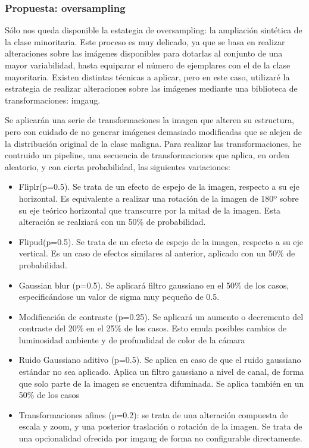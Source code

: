 \subsubsection{Propuesta: oversampling}

Sólo nos queda disponible la estategia de oversampling: la ampliación sintética de la clase minoritaria. Este proceso es muy delicado, ya que se basa en realizar alteraciones sobre las imágenes disponibles para dotarlas al conjunto de una mayor variabilidad, hasta equiparar el número de ejemplares con el de la clase mayoritaria. Existen distintas técnicas a aplicar, pero en este caso, utilizaré la estrategia de realizar alteraciones sobre las imágenes mediante una biblioteca de transformaciones: imgaug.

Se aplicarán una serie de transformaciones la imagen que alteren su estructura, pero con cuidado de no generar imágenes demasiado modificadas que se alejen de la distribución original de la clase maligna. Para realizar las transformaciones, he contruido un pipeline, una secuencia de transformaciones que aplica, en orden aleatorio, y con cierta probabilidad, las siguientes variaciones:

\begin{itemize}
	\item Fliplr(p=0.5). Se trata de un efecto de espejo de la imagen, respecto a su eje horizontal. Es equivalente a realizar una rotación de la imagen de 180º sobre su eje teórico horizontal que transcurre por la mitad de la imagen. Esta alteración se realziará con un 50\% de probabilidad.
	\item Flipud(p=0.5). Se trata de un efecto de espejo de la imagen, respecto a su eje vertical. Es un caso de efectos similares al anterior, aplicado con un 50\% de probabilidad.
	\item Gaussian blur (p=0.5). Se aplicará filtro gaussiano en el 50\% de los casos, especificándose un valor de sigma muy pequeño de 0.5.
	\item Modificación de contraste  (p=0.25). Se aplicará un aumento o decremento del contraste del 20\% en el 25\% de los casos. Esto emula posibles cambios de luminosidad ambiente y de profundidad de color de la cámara
	\item Ruido Gaussiano aditivo  (p=0.5). Se aplica en caso de que el ruido gaussiano estándar no sea aplicado. Aplica un filtro gaussiano a nivel de canal, de forma que solo parte de la imagen se encuentra difuminada.  Se aplica también en un 50\% de los casos
	\item Transformaciones afines  (p=0.2): se trata de una alteración compuesta de escala y zoom, y una posterior traslación o rotación de la imagen. Se trata de una opcionalidad ofrecida por imgaug de forma no configurable directamente.
\end{itemize}

